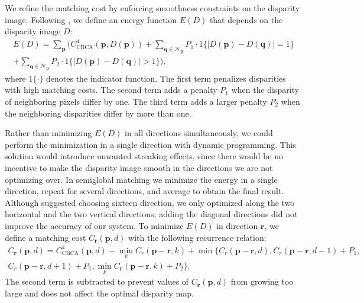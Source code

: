 \documentclass[twoside,11pt]{article}
\begin{document}
We refine the matching cost by enforcing smoothness constraints on the
disparity image. Following \citet{hirschmuller2008stereo}, we define an energy
function $E(D)$ that depends on the disparity image $D$:
%
\begin{multline*} 
E(D) = \sum_{\mathbf{p}} \biggl( C^4_{\text{CBCA}}(\mathbf{p}, D(\mathbf{p}))
+ \sum_{\mathbf{q} \in \mathcal{N}_{\mathbf{p}}} P_1 \cdot 1\{|D(\mathbf{p}) - D(\mathbf{q})| = 1\} \\
+ \sum_{\mathbf{q} \in \mathcal{N}_{\mathbf{p}}} P_2 \cdot 1\{|D(\mathbf{p}) - D(\mathbf{q})| > 1\} \biggr), 
\end{multline*}
%
where $1\{\cdot\}$ denotes the indicator function. The first term penalizes
disparities with high matching costs. The second term adds a penalty $P_1$ when
the disparity of neighboring pixels differ by one. The third term adds a
larger penalty $P_2$ when the neighboring disparities differ by more than one.

Rather than minimizing $E(D)$ in all directions simultaneously, we could
perform the minimization in a single direction with dynamic programming. This
solution would introduce unwanted streaking effects, since there would be no
incentive to make the disparity image smooth in the directions we are not
optimizing over.  In semiglobal matching we minimize the energy in a single
direction, repeat for several directions, and average to obtain the final
result.  Although \citet{hirschmuller2008stereo} suggested choosing sixteen
direction, we only optimized along the two horizontal and the two vertical
directions; adding the diagonal directions did not improve the accuracy of our
system.  To minimize $E(D)$ in direction $\mathbf{r}$, we define a matching
cost $C_{\mathbf{r}}(\mathbf{p}, d)$ with the following recurrence relation:
%
\begin{multline*} C_{\mathbf{r}}(\mathbf{p}, d) = C^4_{\text{CBCA}}(\mathbf{p},
d) - \min_k C_r(\mathbf{p} - \mathbf{r}, k) + \min\biggl\{ C_r(\mathbf{p} -
\mathbf{r}, d), C_r(\mathbf{p} - \mathbf{r}, d - 1) + P_1,\\ C_r(\mathbf{p} -
\mathbf{r}, d + 1) + P_1, \min_k C_{\mathbf{r}}(\mathbf{p} - \mathbf{r}, k) +
P_2 \biggr\}.  \end{multline*}
%
The second term is subtracted to prevent values of $C_\mathbf{r}(\mathbf{p},
d)$ from growing too large and does not affect the optimal disparity map. 
\end{document}
